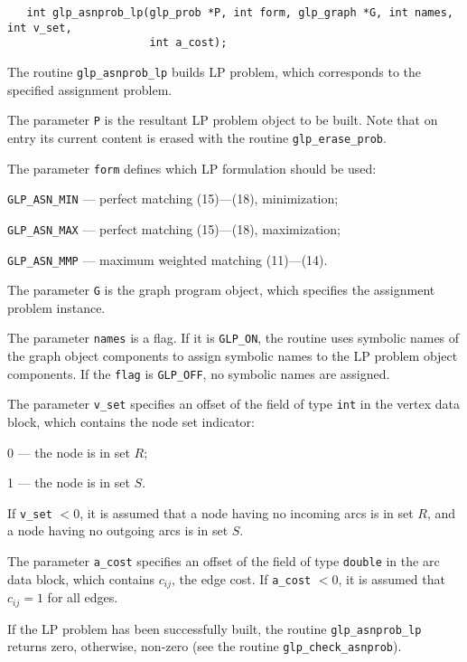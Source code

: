 \documentclass[11pt]{report}
\def\para#1{\noindent{\bf#1}}
\def\synopsis{\para{Synopsis}}
\def\description{\para{Description}}
\def\returns{\para{Returns}}
\begin{document}
\synopsis

\begin{verbatim}
   int glp_asnprob_lp(glp_prob *P, int form, glp_graph *G, int names, int v_set,
                      int a_cost);
\end{verbatim}

\description

The routine \verb|glp_asnprob_lp| builds LP problem, which corresponds
to the specified assignment problem.

The parameter \verb|P| is the resultant LP problem object to be built.
Note that on entry its current content is erased with the routine
\verb|glp_erase_prob|.

The parameter \verb|form| defines which LP formulation should be used:

\verb|GLP_ASN_MIN| --- perfect matching (15)---(18), minimization;

\verb|GLP_ASN_MAX| --- perfect matching (15)---(18), maximization;

\verb|GLP_ASN_MMP| --- maximum weighted matching (11)---(14).

The parameter \verb|G| is the graph program object, which specifies the
assignment problem instance.

The parameter \verb|names| is a flag. If it is \verb|GLP_ON|, the
routine uses symbolic names of the graph object components to assign
symbolic names to the LP problem object components. If the \verb|flag|
is \verb|GLP_OFF|, no symbolic names are assigned.

The parameter \verb|v_set| specifies an offset of the field of type
\verb|int| in the vertex data block, which contains the node set
indicator:

0 --- the node is in set $R$;

1 --- the node is in set $S$.

\noindent
If \verb|v_set| $<0$, it is assumed that a node having no incoming arcs
is in set $R$, and a node having no outgoing arcs is in set $S$.

The parameter \verb|a_cost| specifies an offset of the field of type
\verb|double| in the arc data block, which contains $c_{ij}$, the edge
cost. If \verb|a_cost| $<0$, it is assumed that $c_{ij}=1$ for all
edges.

\newpage

\returns

If the LP problem has been successfully built, the routine
\verb|glp_asnprob_lp| returns zero, otherwise, non-zero (see the
routine \verb|glp_check_asnprob|).
\end{document}

